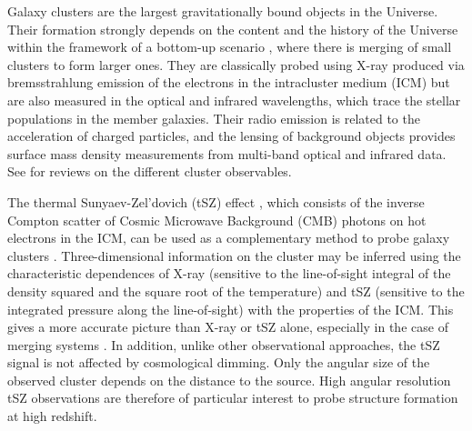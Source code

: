 Galaxy clusters are the largest gravitationally bound objects in the Universe. Their formation strongly depends on the content and the history of the Universe within the framework of a bottom-up scenario \citep[{\it e.g.,} ][]{kravtsov_2012}, where there is merging of small clusters to form larger ones. They are classically probed using \mbox{X-ray} produced via bremsstrahlung emission of the electrons in the intracluster medium (ICM) but are also measured in the optical and infrared wavelengths, which trace the stellar populations in the member galaxies. Their radio emission is related to the acceleration of charged particles, and the lensing of background objects provides surface mass density measurements from multi-band optical and infrared data. See \cite{bohringer_2010, gal_2006, oliver_2012, feretti_2012, kneib_2011} for reviews on the different cluster observables.

The thermal Sunyaev-Zel'dovich (tSZ) effect \citep{SunyaevZeldovich1, SunyaevZeldovich2}, which consists of the inverse Compton scatter of Cosmic Microwave Background (CMB) photons on hot electrons in the ICM, can be used as a complementary method to probe galaxy clusters \citep[see][for a detailed review on the tSZ effect]{Birkinshaw, Carlstrom_et_al_2002}. Three-dimensional information on the cluster may be inferred using the characteristic dependences of \mbox{X-ray} (sensitive to the line-of-sight integral of the density squared and the square root of the temperature) and tSZ (sensitive to the integrated pressure along the line-of-sight) with the properties of the ICM. This gives a more accurate picture than \mbox{X-ray} or tSZ alone, especially in the case of merging systems \citep{Basu}. In addition, unlike other observational approaches, the tSZ signal is not affected by cosmological dimming. Only the angular size of the observed cluster depends on the distance to the source. High angular resolution tSZ observations are therefore of particular interest to probe structure formation at high redshift.

